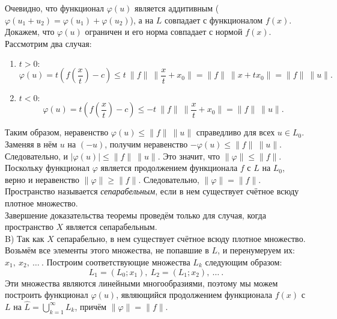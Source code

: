 \documentclass[12pt,a4paper, titlepage]{article}
\begin{document}
Очевидно, что функционал $\varphi(u)$ является аддитивным ($\varphi(u_1 + u_2) = \varphi(u_1) + \varphi(u_2)$), а на $L$ совпадает с функционалом $f(x)$. Докажем, что $\varphi(u)$ ограничен и его норма совпадает с нормой $f(x)$.\\
Рассмотрим два случая:
\begin{enumerate}
\item $t > 0:$\\
$$
\varphi(u) = t \left( f \left(\frac{x}{t}\right) - c \right) \leqslant t \ \|f\| \ \|\frac{x}{t} + x_0\| =
\|f\| \ \|x + tx_0\| = \|f\| \ \|u\|.
$$

\item $t < 0:$\\
$$
\varphi(u) = t \left( f \left(\frac{x}{t}\right) - c \right) \leqslant -t \ \|f\| \ \|\frac{x}{t} + x_0\| = \|f\| \ \|u\|.
$$
\end{enumerate}
Таким образом, неравенство $\varphi(u) \leqslant \|f\| \ \|u\|$ справедливо для всех $u \in L_0$. Заменяя в нём $u$ на $(-u)$, получим неравенство $-\varphi(u) \leqslant \|f\| \ \|u\|$. Следовательно, и $|\varphi (u)| \leqslant \|f\| \ \|u\|$. Это значит, что $\|\varphi\| \leqslant \|f\|$. Поскольку функционал $\varphi$ является продолжением функционала $f$ с $L$ на $L_0$, верно и неравенство $\|\varphi\| \geqslant \|f\|$. Следовательно, $\|\varphi\| = \|f\|$.\\

Пространство называется \textit{сепарабельным}, если в нем существует счётное всюду плотное множество.\\

Завершение доказательства теоремы проведём только для случая, когда пространство $X$ является сепарабельным.\\

B) Так как $X$ сепарабельно, в нем существует счётное всюду плотное множество. Возьмём все элементы этого множества, не попавшие в $L$, и перенумеруем их:
$x_1, \ x_2, \ \dots \ .$
Построим соответствующие множества $L_k$ следующим образом:
$$
L_1 = (L_0; x_1), \ L_2 = (L_1; x_2), \ \dots \ .
$$
Эти множества являются линейными многообразиями, поэтому мы можем построить функционал $\varphi(u)$, являющийся продолжением функционала $f(x)$ с $L$ на $\widehat L = \bigcup\limits_{k=1}^\infty L_k$, причём $\|\varphi\| = \|f\|$.\\
\end{document}

